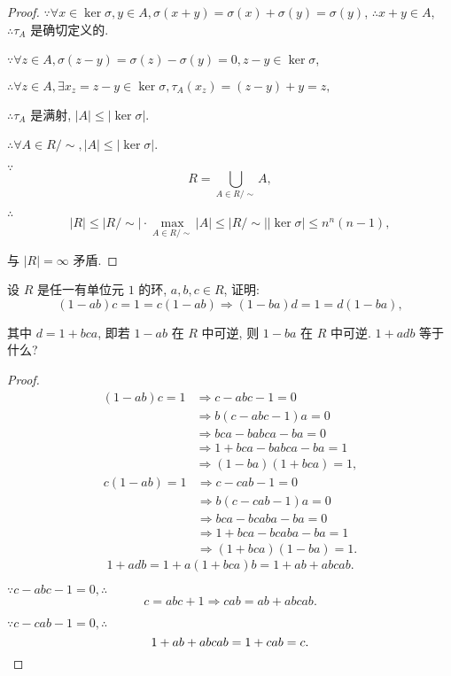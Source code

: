 \documentclass[color=black,device=normal,lang=cn,mode=geye]{elegantnote}
\begin{document}
\begin{proof}
    $\because\forall x\in\ker\sigma,y\in A,\sigma(x+y)=\sigma(x)+\sigma(y)=\sigma(y)$, $\therefore x+y\in A$, $\therefore\tau_A$ 是确切定义的.

    $\because\forall z\in A,\sigma(z-y)=\sigma(z)-\sigma(y)=0,z-y\in\ker\sigma$,

    $\therefore\forall z\in A,\exists x_z=z-y\in\ker\sigma,\tau_A(x_z)=(z-y)+y=z,$

    $\therefore\tau_A$ 是满射, $|A|\leq|\ker\sigma|$.

    $\therefore\forall A\in R/\sim,|A|\leq|\ker\sigma|$.

    $\because$
    \[R=\bigcup\limits_{A\in R/\sim}A,\]

    $\therefore$
    \[|R|\leq|R/\sim|\cdot\max\limits_{A\in R/\sim}|A|\leq|R/\sim||\ker\sigma|\leq n^n(n-1),\]

    与 $|R|=\infty$ 矛盾.
\end{proof}
\begin{exercise}%
    设 $R$ 是任一有单位元 $1$ 的环, $a,b,c\in R$, 证明:
    \[(1-ab)c=1=c(1-ab)\Rightarrow(1-ba)d=1=d(1-ba),\]

    其中 $d=1+bca$, 即若 $1-ab$ 在 $R$ 中可逆, 则 $1-ba$ 在 $R$ 中可逆. $1+adb$ 等于什么?
\end{exercise}
\begin{proof}
    \begin{align*}
        (1-ab)c=1 & \Rightarrow c-abc-1=0 \\
        & \Rightarrow b(c-abc-1)a=0 \\
        & \Rightarrow bca-babca-ba=0 \\
        & \Rightarrow 1+bca-babca-ba=1 \\
        & \Rightarrow (1-ba)(1+bca)=1,
    \end{align*}
    \begin{align*}
        c(1-ab)=1 & \Rightarrow c-cab-1=0 \\
        & \Rightarrow b(c-cab-1)a=0 \\
        & \Rightarrow bca-bcaba-ba=0 \\
        & \Rightarrow 1+bca-bcaba-ba=1 \\
        & \Rightarrow (1+bca)(1-ba)=1.
    \end{align*}
    \[1+adb=1+a(1+bca)b=1+ab+abcab.\]

    $\because c-abc-1=0,\therefore$
    \[c=abc+1\Rightarrow cab=ab+abcab.\]

    $\because c-cab-1=0,\therefore$
    \[1+ab+abcab=1+cab=c.\qedhere\]
\end{proof}
\end{document}
